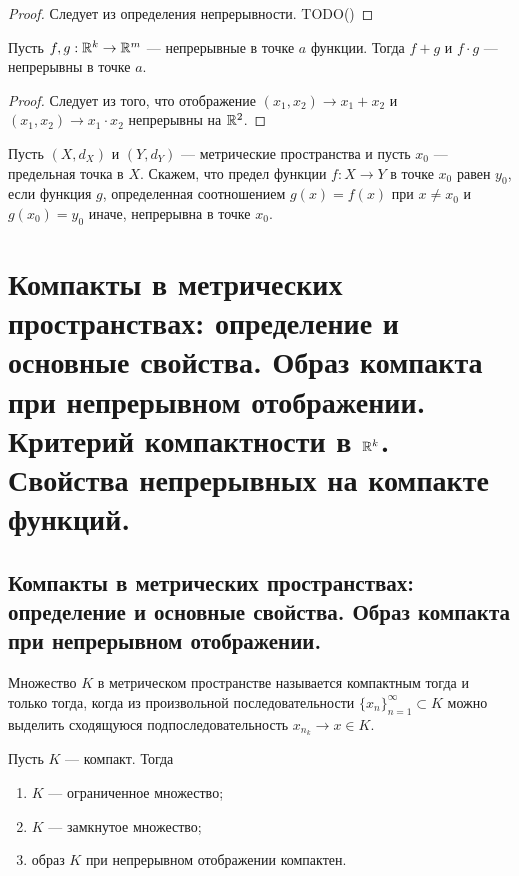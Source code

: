 \documentclass[a4paper]{article}
\theoremstyle{named}
\begin{document}
    \begin{proof}
        Следует из определения непрерывности. TODO()
    \end{proof}

    \begin{consequence*}
        Пусть $f, g: \mathbb{R}^k \to \mathbb{R}^m$ --- непрерывные в точке $a$ функции. Тогда $f + g$ и $f \cdot g$ --- непрерывны в точке $a$.
    \end{consequence*}

    \begin{proof}
        Следует из того, что отображение $(x_1, x_2) \to x_1 + x_2$ и $(x_1, x_2) \to x_1 \cdot x_2$ непрерывны на $\mathbb{R}^2$.
    \end{proof}

    \begin{definition*}
        Пусть $(X, d_X)$ и $(Y, d_Y)$ --- метрические пространства и пусть $x_0$ --- предельная точка в $X$. Скажем, что предел функции $f: X \to Y$ в точке $x_0$ равен $y_0$, если функция $g$, определенная соотношением $g(x) = f(x)$ при $x \neq x_0$ и $g(x_0) = y_0$ иначе, непрерывна в точке $x_0$.
    \end{definition*}
        
    \section{Компакты в метрических пространствах: определение и основные свойства. Образ компакта при непрерывном отображении. Критерий компактности в $\mathbb{R}^k$. Свойства непрерывных на компакте функций.}

    \subsection{Компакты в метрических пространствах: определение и основные свойства. Образ компакта при непрерывном отображении.}

    \begin{definition*}
        Множество $K$ в метрическом пространстве называется компактным тогда и только тогда, когда из произвольной последовательности $\{x_n\}_{n = 1}^{\infty} \subset K$ можно выделить сходящуюся подпоследовательность $x_{n_k} \to x \in K$.
    \end{definition*}

    \begin{lemma*}
        Пусть $K$ --- компакт. Тогда
        \begin{enumerate}
        \item
            $K$ --- ограниченное множество;

        \item
            $K$ --- замкнутое множество;

        \item
            образ $K$ при непрерывном отображении компактен.
        \end{enumerate}
    \end{lemma*}
\end{document}
